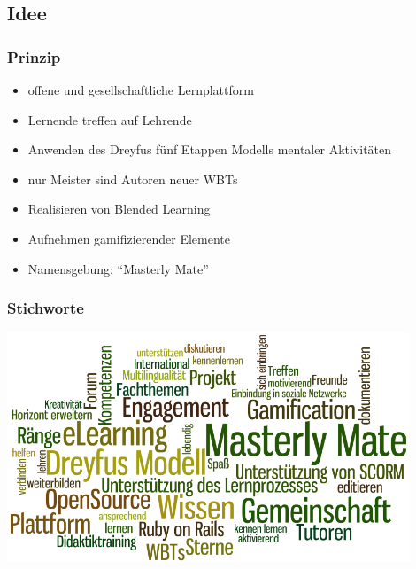 \documentclass[xcolor=dvipsnames, utf8]{beamer}
\begin{document}
\subsection{Idee}
\begin{frame}
\frametitle{Prinzip}
\begin{itemize}
  \item offene und gesellschaftliche Lernplattform
  \item Lernende treffen auf Lehrende
  \item Anwenden des Dreyfus fünf Etappen Modells mentaler Aktivitäten
  \item nur Meister sind Autoren neuer WBTs
  \item Realisieren von Blended Learning
  \item Aufnehmen gamifizierender Elemente
  \item Namensgebung: "`Masterly Mate"'
\end{itemize}
\end{frame}
\begin{frame}
\frametitle{Stichworte}
\centering
\includegraphics[width=0.9\textwidth]{MasterlyMateWolke.png}
\end{frame}
\end{document}
